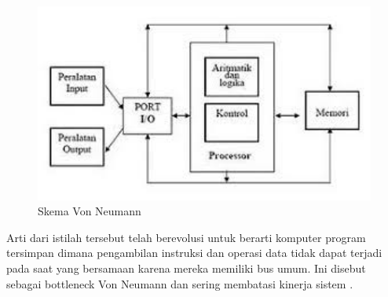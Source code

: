 \begin{figure}[ht]
\centerline{\includegraphics[width=1\textwidth]{figures/vonneumann}}
\caption{Skema Von Neumann}
\label{vonneumann}
\end{figure}
Arti dari istilah tersebut telah berevolusi untuk berarti komputer program tersimpan dimana pengambilan instruksi dan operasi data tidak dapat terjadi pada saat yang bersamaan karena mereka memiliki bus umum. Ini disebut sebagai bottleneck Von Neumann dan sering membatasi kinerja sistem \cite{markgrafneumann}.

